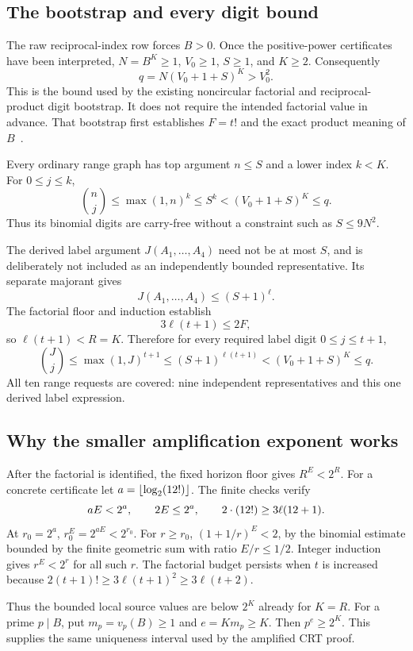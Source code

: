 \documentclass[11pt]{article}
\theoremstyle{definition}\newtheorem{definition}[theorem]{Definition}
\theoremstyle{remark}\newtheorem{remark}[theorem]{Remark}
\begin{document}
\subsection{The bootstrap and every digit bound}

The raw reciprocal-index row forces $B>0$. Once the positive-power certificates have been interpreted, $N=B^K\ge1$, $V_0\ge1$, $S\ge1$, and $K\ge2$. Consequently
\[
 q=N(V_0+1+S)^K>V_0^2.
\]
This is the bound used by the existing noncircular factorial and reciprocal-product digit bootstrap. It does not require the intended factorial value in advance. That bootstrap first establishes $F=t!$ and the exact product meaning of $B$~\cite{round14}.

Every ordinary range graph has top argument $n\le S$ and a lower index $k<K$. For $0\le j\le k$,
\[
 \binom nj\le\max(1,n)^k\le S^k<(V_0+1+S)^K\le q.
\]
Thus its binomial digits are carry-free without a constraint such as $S\le9N^2$.

The derived label argument $J(A_1,\ldots,A_4)$ need not be at most $S$, and is deliberately not included as an independently bounded representative. Its separate majorant gives
\[
 J(A_1,\ldots,A_4)\le(S+1)^\ell.
\]
The factorial floor and induction establish
\[
 3\ell(t+1)\le2F,
\]
so $\ell(t+1)<R=K$. Therefore for every required label digit $0\le j\le t+1$,
\[
 \binom{J}{j}\le\max(1,J)^{t+1}
 \le(S+1)^{\ell(t+1)}<(V_0+1+S)^K\le q.
\]
All ten range requests are covered: nine independent representatives and this one derived label expression.

\subsection{Why the smaller amplification exponent works}

After the factorial is identified, the fixed horizon floor gives $R^E<2^R$. For a concrete certificate let $a=\lfloor\log_2(12!)\rfloor$. The finite checks verify
\[
 aE<2^a,\qquad 2E\le2^a,\qquad
 2\cdot(12!)\ge3\ell(12+1).
\]
At $r_0=2^a$, $r_0^E=2^{aE}<2^{r_0}$. For $r\ge r_0$,
$(1+1/r)^E<2$, by the binomial estimate bounded by the finite geometric sum with ratio $E/r\le1/2$. Integer induction gives $r^E<2^r$ for all such $r$. The factorial budget persists when $t$ is increased because
$2(t+1)!\ge3\ell(t+1)^2\ge3\ell(t+2)$.

Thus the bounded local source values are below $2^K$ already for $K=R$. For a prime $p\mid B$, put $m_p=v_p(B)\ge1$ and $e=Km_p\ge K$. Then $p^e\ge2^K$. This supplies the same uniqueness interval used by the amplified CRT proof.
\end{document}
